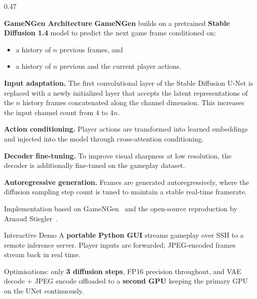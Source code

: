 \documentclass[final]{beamer}
\begin{document}
\begin{frame}[t]{}
\begin{columns}[T]
\begin{column}{0.47\textwidth}
\begin{block}{\centering \textbf{GameNGen Architecture}}
\textbf{GameNGen} builds on a pretrained \textbf{Stable Diffusion 1.4} model to predict the next game frame conditioned on:
\begin{itemize}
    \item a history of $n$ previous frames, and
    \item a history of $n$ previous and the current player actions.
\end{itemize}

\vspace{0.3em}

\textbf{Input adaptation.}
The first convolutional layer of the Stable Diffusion U-Net is replaced with a newly initialized layer that accepts the latent representations of the $n$ history frames concatenated along the channel dimension.  
This increases the input channel count from $4$ to $4n$.

\vspace{0.3em}

\textbf{Action conditioning.}
Player actions are transformed into learned embeddings and injected into the model through cross-attention conditioning.

\vspace{0.3em}

\textbf{Decoder fine-tuning.}
To improve visual sharpness at low resolution, the decoder is additionally fine-tuned on the gameplay dataset.

\vspace{0.3em}

\textbf{Autoregressive generation.}
Frames are generated autoregressively, where the diffusion sampling step count is tuned to maintain a stable real-time framerate.

\vspace{0.5em}

{\footnotesize
Implementation based on GameNGen~\cite{valevski2025diffusionmodelsrealtimegame} and the open-source reproduction by Arnaud Stiegler~\cite{stiegler2024gamengenrepro}.
}

\end{block}

  \vskip0.25cm

  \begin{block}{Interactive Demo}
    A \textbf{portable Python GUI} streams gameplay over SSH to a remote
    inference server. Player inputs are forwarded; JPEG-encoded frames
    stream back in real time.

    \smallskip
    Optimisations: only \textbf{3 diffusion steps}, FP16
    precision throughout, and VAE decode + JPEG encode offloaded to a
    \textbf{second GPU} keeping the primary GPU on the UNet continuously.


\end{block}
\end{column}
\end{columns}
\end{frame}
\end{document}
